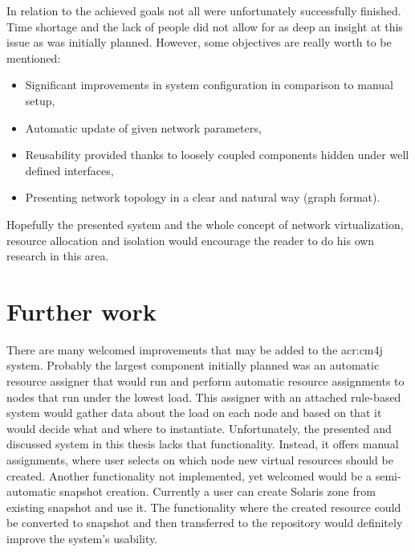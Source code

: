 \documentclass[11pt,openany]{book}
\begin{document}
      In relation to the achieved goals not all were unfortunately successfully finished. Time shortage and the lack of people
      did not allow for as deep an insight at this issue as was initially planned. However, some objectives are really
      worth to be mentioned:
      
      \begin{itemize}
        \item Significant improvements in system configuration in comparison to manual setup,
        \item Automatic update of given network parameters,
        \item Reusability provided thanks to loosely coupled components hidden under well defined interfaces,
        \item Presenting network topology in a clear and natural way (graph format).
      \end{itemize}
		
      Hopefully the presented system and the whole concept of network virtualization, resource allocation and isolation 
	    would encourage the reader to do his own research in this area.
		

    \section{Further work}
		\label{sub:sum:further}
	
      There are many welcomed improvements that may be added to the \gls{acr:cm4j} system. Probably the largest
      component initially planned was an automatic resource assigner that would run and perform automatic resource
      assignments to nodes that run under the lowest load. This assigner with an attached rule-based system would gather data
      about the load on each node and based on that it would decide what and where to instantiate.  Unfortunately, the presented and discussed
      system in this thesis lacks that functionality. Instead, it offers manual assignments, where user selects on which
      node new virtual resources should be created. Another functionality not implemented, yet welcomed would be a semi-automatic
      snapshot creation. Currently a user can create Solaris zone from existing snapshot and use it. The functionality where
      the created resource could be converted to snapshot and then transferred to the repository would definitely improve
      the system's usability.



  \printglossaries

  
  
\end{document}
